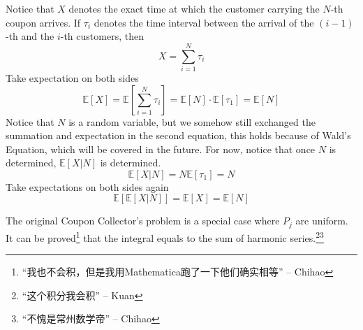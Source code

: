         Notice that $X$ denotes the exact time at which the customer carrying the $N$-th coupon arrives. If $\tau_i$ denotes the time interval between the arrival of the $(i-1)$-th and the $i$-th customers, then
        \[ X = \sum_{i=1}^N \tau_i \]
        Take expectation on both sides
        \[ \mathbb{E}[X] = \mathbb{E}\left[ \sum_{i=1}^N \tau_i \right] = \mathbb{E}[N]\cdot\mathbb{E}[\tau_1] = \mathbb{E}[N] \]
        Notice that $N$ is a random variable, but we somehow still exchanged the summation and expectation in the second equation, this holds because of Wald's Equation, which will be covered in the future. For now, notice that once $N$ is determined, $\mathbb{E}[X|N]$ is determined.
        \[ \mathbb{E}[X|N] = N\mathbb{E}[\tau_1] = N \]
        Take expectations on both sides again
        \[ \mathbb{E}[\mathbb{E}[X|N]] = \mathbb{E}[X] = \mathbb{E}[N] \]
        \begin{remark}
            The original Coupon Collector's problem is a special case where $P_j$ are uniform. It can be proved\footnote{“我也不会积，但是我用Mathematica跑了一下他们确实相等” -- Chihao} that the integral equals to the sum of harmonic series.\footnote{“这个积分我会积” -- Kuan}\footnote{“不愧是常州数学帝” -- Chihao}
        \end{remark}

